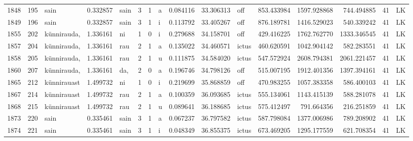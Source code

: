 \begin{tabular}{lrlrllllrrlrrrll}
1848 &         195 &             sain &  0.332857 &    sain &        3 &      1 &       a &      0.084116 &     33.306313 &    off &   853.433984 &  1597.928868 &   744.494885 &     41 &        LK \\
1849 &         196 &             sain &  0.332857 &    sain &        3 &      1 &       i &      0.113792 &     33.405267 &    off &   876.189781 &  1416.529023 &   540.339242 &     41 &        LK \\
1855 &         202 &      künnirauda, &  1.336161 &      ni &        1 &      0 &       i &      0.279688 &     34.158701 &    off &   429.416225 &  1762.762770 &  1333.346545 &     41 &        LK \\
1857 &         204 &      künnirauda, &  1.336161 &     rau &        2 &      1 &       a &      0.135022 &     34.460571 &  ictus &   460.620591 &  1042.904142 &   582.283551 &     41 &        LK \\
1858 &         205 &      künnirauda, &  1.336161 &     rau &        2 &      1 &       u &      0.111875 &     34.584020 &  ictus &   547.572924 &  2608.794381 &  2061.221457 &     41 &        LK \\
1860 &         207 &      künnirauda, &  1.336161 &     da, &        2 &      0 &       a &      0.196746 &     34.798126 &    off &   515.007195 &  1912.401356 &  1397.394161 &     41 &        LK \\
1865 &         212 &      künnirauast &  1.499732 &      ni &        1 &      0 &       i &      0.219699 &     35.868859 &    off &   470.983255 &  1057.383358 &   586.400103 &     41 &        LK \\
1867 &         214 &      künnirauast &  1.499732 &     rau &        2 &      1 &       a &      0.100359 &     36.093685 &  ictus &   555.134061 &  1143.415139 &   588.281078 &     41 &        LK \\
1868 &         215 &      künnirauast &  1.499732 &     rau &        2 &      1 &       u &      0.089641 &     36.188685 &  ictus &   575.412497 &   791.664356 &   216.251859 &     41 &        LK \\
1873 &         220 &             sain &  0.335461 &    sain &        3 &      1 &       a &      0.067237 &     36.797582 &  ictus &   587.798084 &  1377.006986 &   789.208902 &     41 &        LK \\
1874 &         221 &             sain &  0.335461 &    sain &        3 &      1 &       i &      0.048349 &     36.855375 &  ictus &   673.469205 &  1295.177559 &   621.708354 &     41 &        LK \\

\end{tabular}
